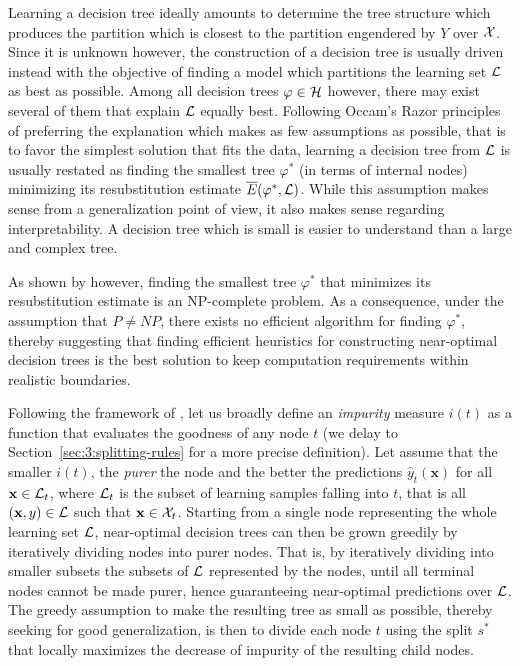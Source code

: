 Learning a decision tree ideally amounts to determine the tree structure which
produces the partition which is closest to the partition engendered by $Y$ over
${\cal X}$. Since it is unknown however, the construction of a decision tree is usually
driven instead with the objective of finding a model which partitions the
learning set ${\cal L}$ as best as possible. Among all decision trees $\varphi
\in {\cal H}$ however, there may exist several of them that explain ${\cal L}$
equally best. Following Occam's Razor principles~\citep{blumer:1987} of preferring the explanation
which makes as few assumptions as possible, that is to favor the simplest
solution that fits the data, learning a decision tree from ${\cal L}$ is
usually restated as finding the smallest tree $\varphi^*$ (in terms of internal nodes) minimizing its
resubstitution estimate $\overline{E}(\varphi^*, {\cal L})$. While this
assumption makes sense from a generalization point of view, it also makes
sense regarding interpretability. A decision tree which is small is easier
to understand than a large and complex tree.

As shown by \citet{hyafil:1976} however, finding the smallest tree $\varphi^*$
that minimizes its resubstitution estimate is an NP-complete problem. As a
consequence, under the assumption that $P \neq NP$, there exists no efficient
algorithm for finding $\varphi^*$, thereby suggesting that finding efficient heuristics
for constructing near-optimal decision trees is the best solution to keep computation
requirements within realistic boundaries.

Following the framework of \citet{breiman:1984}, let us broadly define an
\textit{impurity} measure $i(t)$ as a function that evaluates the goodness of
any node $t$ (we delay to Section~\ref{sec:3:splitting-rules} for a more
precise definition). Let assume that the smaller $i(t)$, the \textit{purer} the
node and the better the predictions $\widehat{y}_t(\mathbf{x})$ for all
$\mathbf{x} \in {\cal L}_t$, where ${\cal L}_t$ is the subset of learning
samples falling into $t$, that is all $(\mathbf{x}, y) \in {\cal L}$ such that
$\mathbf{x} \in {\cal X}_t$.
Starting from a single node representing the whole learning set  ${\cal L}$,
near-optimal decision trees can then be grown greedily by iteratively dividing
nodes into purer nodes. That is, by iteratively  dividing into smaller subsets the
subsets of ${\cal L}$ represented by the nodes, until all terminal nodes cannot
be made purer, hence guaranteeing near-optimal predictions over ${\cal L}$. The
greedy assumption to make the resulting tree as small as possible, thereby
seeking for good generalization, is then to divide each node $t$ using the
split $s^*$ that locally maximizes the decrease of impurity of the resulting child nodes.

